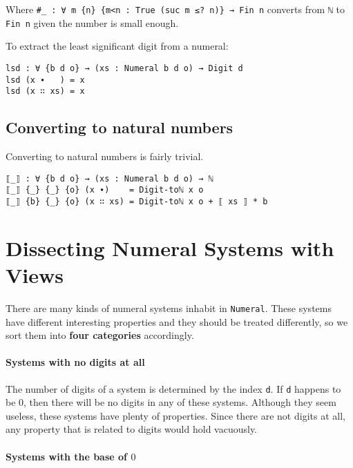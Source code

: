 \documentclass[\main/thesis.tex]{subfiles}
\begin{document}
Where {\lstinline|#_ : ∀ m {n} {m<n : True (suc m ≤? n)} → Fin n|} converts from
{\lstinline|ℕ|} to {\lstinline|Fin n|} given the number is small enough.

To extract the least significant digit from a numeral:

\begin{lstlisting}
lsd : ∀ {b d o} → (xs : Numeral b d o) → Digit d
lsd (x ∙   ) = x
lsd (x ∷ xs) = x
\end{lstlisting}

\subsection{Converting to natural numbers}

Converting to natural numbers is fairly trivial.

\begin{lstlisting}
⟦_⟧ : ∀ {b d o} → (xs : Numeral b d o) → ℕ
⟦_⟧ {_} {_} {o} (x ∙)    = Digit-toℕ x o
⟦_⟧ {b} {_} {o} (x ∷ xs) = Digit-toℕ x o + ⟦ xs ⟧ * b
\end{lstlisting}


\section{Dissecting Numeral Systems with Views}\label{views}

There are many kinds of numeral systems inhabit in {\lstinline|Numeral|}.
These systems have different interesting properties and they should be treated
differently, so we sort them into \textbf{four categories} accordingly.

\paragraph{Systems with no digits at all}

The number of digits of a system is determined by the index {\lstinline|d|}.
If {\lstinline|d|} happens to be $ 0 $, then there will be no digits in any of
these systems. Although they seem useless, these systems have plenty of properties.
Since there are not digits at all, any property that is related to digits would
hold vacuously.

\paragraph{Systems with the base of $ 0 $}
\end{document}
